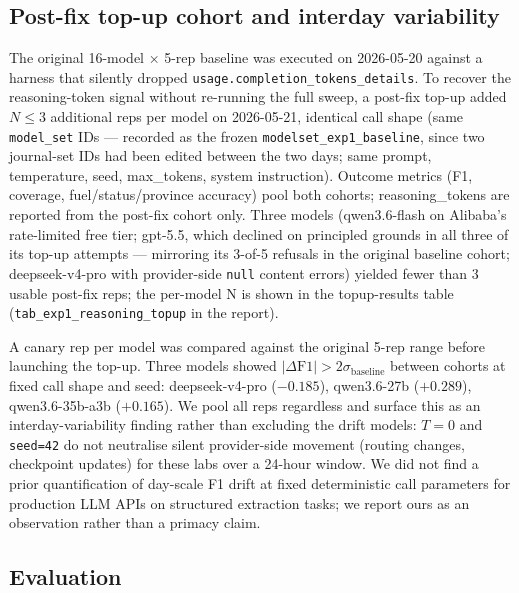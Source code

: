 \documentclass[a4paper,11pt]{article}
\begin{document}
\subsection*{Post-fix top-up cohort and interday
variability}

The original 16-model × 5-rep baseline was executed on 2026-05-20
against a harness that silently dropped
\texttt{usage.completion\_tokens\_details}. To recover the
reasoning-token signal without re-running the full sweep, a post-fix
top-up added \(N{\leq}3\) additional reps per model on 2026-05-21,
identical call shape (same \texttt{model\_set} IDs --- recorded as the
frozen \texttt{modelset\_exp1\_baseline}, since two journal-set IDs had
been edited between the two days; same prompt, temperature, seed,
max\_tokens, system instruction). Outcome metrics (F1, coverage,
fuel/status/province accuracy) pool both cohorts; reasoning\_tokens are
reported from the post-fix cohort only. Three models (qwen3.6-flash on
Alibaba's rate-limited free tier; gpt-5.5, which declined on principled
grounds in all three of its top-up attempts --- mirroring its 3-of-5
refusals in the original baseline cohort; deepseek-v4-pro with
provider-side \texttt{null} content errors) yielded fewer than 3 usable
post-fix reps; the per-model N is shown in the topup-results table
(\texttt{tab\_exp1\_reasoning\_topup} in the report).

A canary rep per model was compared against the original 5-rep range
before launching the top-up. Three models showed
\(|\Delta\text{F1}| > 2\sigma_{\text{baseline}}\) between cohorts at
fixed call shape and seed: deepseek-v4-pro (\(-0.185\)), qwen3.6-27b
(\(+0.289\)), qwen3.6-35b-a3b (\(+0.165\)). We pool all reps regardless
and surface this as an interday-variability finding rather than
excluding the drift models: \(T{=}0\) and \texttt{seed=42} do not
neutralise silent provider-side movement (routing changes, checkpoint
updates) for these labs over a 24-hour window. We did not find a prior
quantification of day-scale F1 drift at fixed deterministic call
parameters for production LLM APIs on structured extraction tasks; we
report ours as an observation rather than a primacy claim.

\subsection*{Evaluation}
\end{document}
